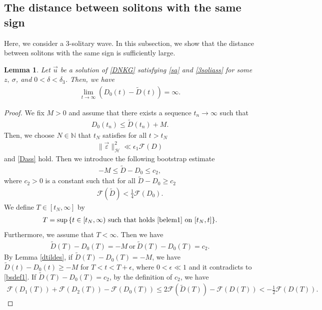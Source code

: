 \documentclass[reqno]{amsart}
\theoremstyle{plain}
\newtheorem{lemma}[theorem]{Lemma}
\theoremstyle{definition}
\numberwithin{equation}{section}
\newcommand{\1}{\mathbbm{1}}
\begin{document}
\subsection{The distance between solitons with the same sign}
Here, we consider a 3-solitary wave. In this subsection, we show that the distance between solitons with the same sign is sufficiently large.
\begin{lemma}\label{repcondlem}
Let $\vec{u}$ be a solution of \eqref{DNKG} satisfying \eqref{sa} and \eqref{3soliass} for some $z,\ \sigma$, and $0<\delta<\delta_3$. Then, we have
\begin{align}\label{d0long}
\lim_{t\to\infty}\left(D_0(t)-\tilde{D}(t)\right)=\infty.
\end{align}
\end{lemma}
\begin{proof}
We fix $M>0$ and assume that there exists a sequence $t_n\to \infty$ such that 
\begin{align}\label{replemass1}
D_0(t_n)\leq \tilde{D}(t_n)+M.
\end{align}
Then, we choose $N\in \mathbb{N}$ that $t_N$ satisfies for all $t>t_N$
\begin{align}\label{epsmall}
\|\vec{\varepsilon}\|_{\mathcal{H}}^2\ll \epsilon_1\mathcal{F}(D)
\end{align}
and \eqref{Dass} hold. Then we introduce  the following bootstrap estimate
\begin{align}\label{belem1}
-M\leq \tilde{D}-D_0\leq c_2,
\end{align}
where $c_2>0$ is a constant such that for all $\tilde{D}-D_0\geq c_2$
\begin{align}\label{repasslem2}
\mathcal{F}(\tilde{D})<\frac{1}{4}\mathcal{F}(D_0).
\end{align}
We define $T\in [t_N,\infty]$ by
\begin{align}\label{bsdef1}
T=\sup{\{ t\in[t_N, \infty)\ \mbox{such that holds}\ \eqref{belem1}\ \mbox{on}\ [t_N,t] \}} .
\end{align}
Furthermore, we assume that $T<\infty$. Then we have
\begin{align*}
\tilde{D}(T)-D_0(T)=-M\ \mbox{or}\ \tilde{D}(T)-D_0(T)=c_2.
\end{align*}
By Lemma \ref{dtildes}, if $\tilde{D}(T)-D_0(T)=-M$, we have $\tilde{D}(t)-D_0(t)\geq -M$ for $T<t<T+\epsilon$, where $0<\epsilon\ll 1$ and it contradicts to \eqref{bsdef1}. If $\tilde{D}(T)-D_0(T)=c_2$, by the definition of $c_2$, we have
\begin{align*}
\mathcal{F}(D_1(T))+\mathcal{F}(D_2(T))-\mathcal{F}(D_0(T))\leq 2\mathcal{F}(\tilde{D}(T))-\mathcal{F}(D(T))<-\frac{1}{2}\mathcal{F}(D(T)).

\end{align*}
\end{proof}
\end{document}
